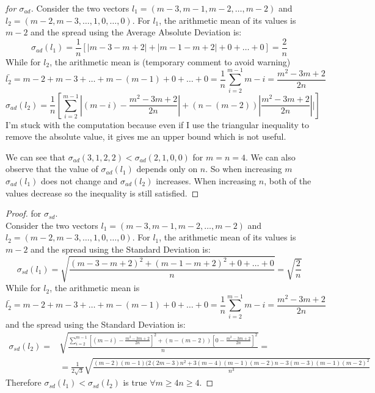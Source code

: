 \documentclass[version=3.21, pagesize, twoside=off, bibliography=totoc, DIV=calc, fontsize=12pt, a4paper]{scrartcl}
\begin{document}
\begin{proof}[for $\sigma_{ad}$]
	Consider the two vectors $l_1=(m-3, m-1, m-2, \dots, m-2)$ and $l_2=(m-2, m-3, \dots, 1, 0, \dots, 0)$. For $l_1$, the arithmetic mean of its values is $m-2$ and the spread using the Average Absolute Deviation is: 
	\[\sigma_{ad}(l_1)=\frac{1}{n}[|m-3-m+2|+|m-1-m+2|+ 0 + \dots + 0]= \frac{2}{n}\]
	While for $l_2$, the arithmetic mean is 
(temporary comment to avoid warning)
	\[\bar{l_2}=m-2+m-3+\dots+m-(m-1)+0+\dots+0= \frac{1}{n}\sum_{i=2}^{m-1}{m-i}= \frac{m^2-3m+2}{2n}\]
	\[\sigma_{ad}(l_2)=\frac{1}{n}[\sum_{i=2}^{m-1}{|(m-i)-\frac{m^2-3m+2}{2n}|+(n-(m-2))|\frac{m^2-3m+2}{2n}|}|]\]
	I'm stuck with the computation because even if I use the triangular inequality to remove the absolute value, it gives me an upper bound which is not useful.

	\vspace{0.5cm}
	We can see that $\sigma_{ad}(3,1,2,2)<\sigma_{ad}(2,1,0,0)$ for $m=n=4$. We can also observe that the value of $\sigma_{ad}(l_1)$ depends only on $n$. So when increasing $m$ $\sigma_{ad}(l_1)$ does not change and $\sigma_{ad}(l_2)$ increases. When increasing $n$, both of the values decrease so the inequality is still satisfied. 
\end{proof}

\begin{proof} for $\sigma_{sd}$. \\
	Consider the two vectors $l_1=(m-3, m-1, m-2, \dots, m-2)$ and $l_2=(m-2, m-3, \dots, 1, 0, \dots, 0)$. For $l_1$, the arithmetic mean of its values is $m-2$ and the spread using the Standard Deviation is: 
	\[\sigma_{sd}(l_1)=\sqrt{\frac{(m-3-m+2)^2+(m-1-m+2)^2+ 0 + \dots + 0}{n}}= \sqrt{\frac{2}{n}}\]
	While for $l_2$, the arithmetic mean is 
	\[\bar{l_2}=m-2+m-3+\dots+m-(m-1)+0+\dots+0= \frac{1}{n}\sum_{i=2}^{m-1}{m-i}= \frac{m^2-3m+2}{2n}\]
	and the spread using the Standard Deviation is: 
	\begin{align}
		\sigma_{sd}(l_2)=&\sqrt{\frac{\sum_{i=2}^{m-1}{[(m-i)-\frac{m^2-3m+2}{2n}]^2+(n-(m-2))[0-\frac{m^2-3m+2}{2n}]^2}}{n}}= \\
		& =\textstyle{\frac{1}{2 \sqrt{3}} \sqrt{\frac{(m - 2) (m - 1) (2 (2 m - 3) n^2 + 3 (m - 4) (m - 1) (m - 2) n - 3 (m - 3) (m - 1) (m - 2)^2}{n^3}}}
	\end{align}
	Therefore $\sigma_{sd}(l_1)<\sigma_{sd}(l_2)$ is true $\forall m \geq 4 n\geq 4$.
\end{proof}
\end{document}
